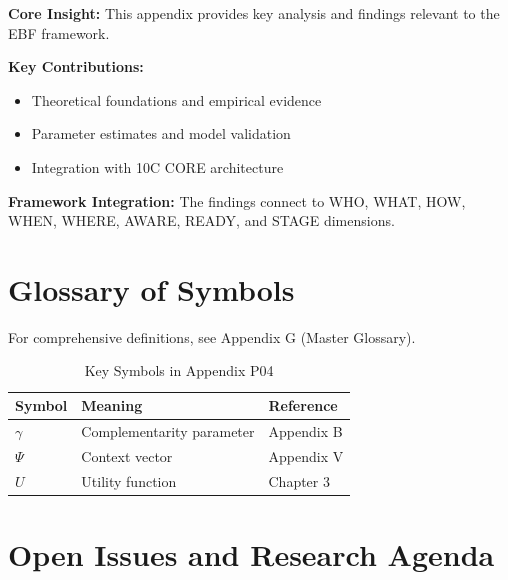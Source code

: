 \begin{tcolorbox}[colback=gray!5!white, colframe=gray!75!black,
    title=Appendix P04 Summary]

\textbf{Core Insight:}
This appendix provides key analysis and findings relevant to the EBF framework.

\textbf{Key Contributions:}
\begin{itemize}[nosep]
    \item Theoretical foundations and empirical evidence
    \item Parameter estimates and model validation
    \item Integration with 10C CORE architecture
\end{itemize}

\textbf{Framework Integration:}
The findings connect to WHO, WHAT, HOW, WHEN, WHERE, AWARE, READY, and STAGE dimensions.

\end{tcolorbox}

\section{Glossary of Symbols}
\label{sec:p04-glossary}

For comprehensive definitions, see Appendix G (Master Glossary).

\begin{table}[htbp]
\centering
\caption{Key Symbols in Appendix P04}
\begin{tabular}{lll}
\toprule
\textbf{Symbol} & \textbf{Meaning} & \textbf{Reference} \\
\midrule
$\gamma$ & Complementarity parameter & Appendix B \\
$\Psi$ & Context vector & Appendix V \\
$U$ & Utility function & Chapter 3 \\
\bottomrule
\end{tabular}
\end{table}



\section{Open Issues and Research Agenda}
\label{sec:p04-open}

